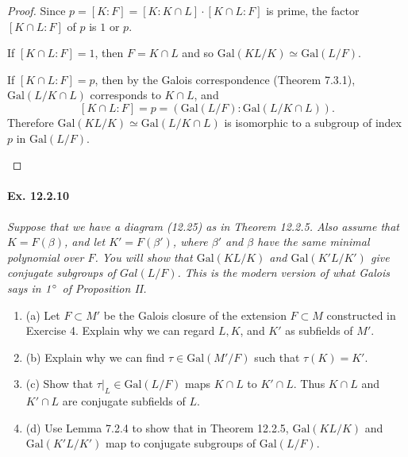 \documentclass[11pt,a4paper]{article}
\newcommand{\be} {\begin{enumerate}}
\newcommand{\ee} {\end{enumerate}}
\newcommand{\Gal}{\mathrm{Gal}}
\begin{document}
\begin{proof}
Since $ p = [K:F] = [K:K \cap L]\cdot [K\cap L:F]$ is prime, the factor $ [K\cap L:F]$ of $p$ is $1$ or $p$.

If $[K\cap L:F] = 1$, then $F = K\cap L$ and so $\Gal(KL/K) \simeq \Gal(L/F)$.

If $[K \cap L:F] = p$, then by the Galois correspondence (Theorem 7.3.1), $\Gal(L/K\cap L)$ corresponds to $K\cap L$, and
$$[K \cap L : F] = p = (\Gal(L/F) : \Gal(L/K\cap L) ).$$
Therefore $\Gal(KL/K) \simeq \Gal(L / K\cap L)$ is isomorphic to a subgroup of index $p$ in $\Gal(L/F)$.
\begin{center}
\end{center}
\end{proof}

\paragraph{Ex. 12.2.10}

{\it Suppose that we have a diagram (12.25) as in Theorem 12.2.5. Also assume that $K = F(\beta)$, and let $K' = F(\beta')$, where $\beta'$ and $\beta$ have the same minimal polynomial over $F$. You will show that $\Gal(KL/K)$ and $\Gal(K'L/K')$ give conjugate subgroups of $Gal(L/F)$. This is the modern version of what Galois says in $\it 1^{\circ}$ of Proposition II.
\be
\item[(a)] Let $F \subset M'$ be the Galois closure of the extension $F \subset M$ constructed in Exercise 4. Explain why we can regard $L,K$, and $K'$ as subfields of $M'$.
\item[(b)] Explain why we can find $\tau \in \Gal(M'/F)$ such that $\tau(K) = K'$.
\item[(c)] Show that $\tau|_L \in \Gal(L/F)$ maps $K \cap L$ to $K' \cap L$. Thus $K \cap L$ and $K' \cap L$ are conjugate subfields of $L$.
\item[(d)] Use Lemma 7.2.4 to show that in Theorem 12.2.5, $\Gal(KL/K)$ and $\Gal(K'L/K')$ map to conjugate subgroups of $\Gal(L/F)$.
\ee
}
\end{document}
